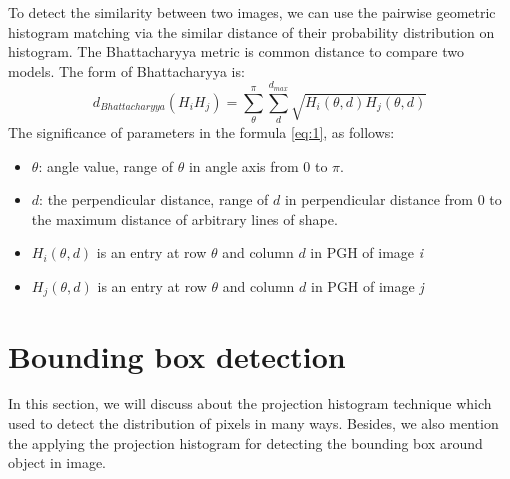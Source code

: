 To detect the similarity between two images, we can use the pairwise geometric histogram matching via the similar distance of their probability distribution on histogram. The Bhattacharyya metric is common distance to compare two models. The form of Bhattacharyya is:
\begin{equation}
	\label{eq:1}
d_{Bhattacharyya} (H_{i}H_{j}) = \sum\limits_{\theta}^{\pi}\sum\limits_{d}^{d_{max}}\sqrt{H_{i}(\theta,d)H_{j}(\theta,d)}
\end{equation}
The significance of parameters in the formula \ref{eq:1}, as follows:
\begin{itemize}
\item $\theta$: angle value, range of $\theta$ in angle axis from 0 to $\pi$.
\item $d$: the perpendicular distance, range of $d$ in perpendicular distance from 0 to the maximum distance of arbitrary lines of shape.
\item $H_{i}(\theta,d)$ is an entry at row $\theta$ and column $d$ in PGH of image \textit{i}
\item $H_{j}(\theta,d)$ is an entry at row $\theta$ and column $d$ in PGH of image \textit{j}
\end{itemize}
\section{Bounding box detection}
In this section, we will discuss about the projection histogram technique which used to detect the distribution of pixels in many ways. Besides, we also mention the applying the projection histogram for detecting the bounding box around object in image.
